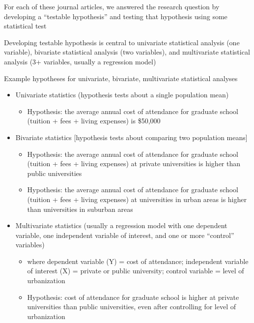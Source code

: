\documentclass[
  letterpaper,
  DIV=11,
  numbers=noendperiod]{scrartcl}
\providecommand{\tightlist}{%
  \setlength{\itemsep}{0pt}\setlength{\parskip}{0pt}}\usepackage{longtable,booktabs,array}
\begin{document}
For each of these journal articles, we answered the research question by
developing a ``testable hypothesis'' and testing that hypothesis using
some statistical test

Developing testable hypothesis is central to univariate statistical
analysis (one variable), bivariate statistical analysis (two variables),
and multivariate statistical analysis (3+ variables, usually a
regression model)

Example hypotheses for univariate, bivariate, multivariate statistical
analyses

\begin{itemize}
\tightlist
\item
  Univariate statistics (hypothesis tests about a single population
  mean)

  \begin{itemize}
  \tightlist
  \item
    Hypothesis: the average annual cost of attendance for graduate
    school (tuition + fees + living expenses) is \$50,000
  \end{itemize}
\item
  Bivariate statistics {[}hypothesis tests about comparing two
  population means{]}

  \begin{itemize}
  \tightlist
  \item
    Hypothesis: the average annual cost of attendance for graduate
    school (tuition + fees + living expenses) at private universities is
    higher than public universities
  \item
    Hypothesis: the average annual cost of attendance for graduate
    school (tuition + fees + living expenses) at universities in urban
    areas is higher than universities in suburban areas
  \end{itemize}
\item
  Multivariate statistics (usually a regression model with one dependent
  variable, one independent variable of interest, and one or more
  ``control'' variables)

  \begin{itemize}
  \tightlist
  \item
    where dependent variable (Y) = cost of attendance; independent
    variable of interest (X) = private or public university; control
    variable = level of urbanization
  \item
    Hypothesis: cost of attendance for graduate school is higher at
    private universities than public universities, even after
    controlling for level of urbanization
  \end{itemize}
\end{itemize}
\end{document}
